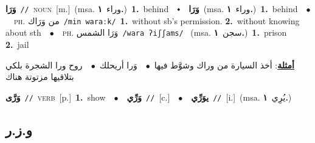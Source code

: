 \documentclass[10pt,a4paper,twoside]{article} %
\begin{document}
\begin{multicols}{2}
{\setlength\topsep{0pt}\textbf{\foreignlanguage{arabic}{وَرَا}}\ {\color{gray}\texttt{//}\color{black}}\ \textsc{noun}\ [m.]\ \color{gray}(msa. \foreignlanguage{arabic}{وراء}~\foreignlanguage{arabic}{\textbf{١.}})\color{black}\ \textbf{1.}~behind\ \ $\smblkdiamond$\ \ \setlength\topsep{0pt}\textbf{\foreignlanguage{arabic}{وَرَا}}\ \color{gray}(msa. \foreignlanguage{arabic}{وراء}~\foreignlanguage{arabic}{\textbf{١.}})\color{black}\ \textbf{1.}~behind\ \ $\bullet$\ \ \textsc{ph.} \color{gray} \foreignlanguage{arabic}{من وَرَاك}\color{black}\ {\color{gray}\texttt{/{\sffamily min waraːk}/}\color{black}}\ \textbf{1.}~without sb's permission.  \textbf{2.}~without knowing about sth\ \ $\bullet$\ \ \textsc{ph.} \color{gray} \foreignlanguage{arabic}{وَرَا الشمس}\color{black}\ {\color{gray}\texttt{/{\sffamily wara ʔiʃʃams}/}\color{black}}\ \color{gray} (msa. \foreignlanguage{arabic}{سجن}~\foreignlanguage{arabic}{\textbf{١.}})\color{black}\ \textbf{1.}~prison  \textbf{2.}~jail\  \begin{flushright}\color{gray}\foreignlanguage{arabic}{\textbf{\underline{\foreignlanguage{arabic}{أمثلة}}}: أخذ السيارة من وراك وشوَّط فيها\ $\bullet$\ \  وَرا أريحلك\ $\bullet$\ \  روح ورا الشجرة بلكي بتلاقيها مزتوتة هناك}\end{flushright}\color{black}} \vspace{2mm}

{\setlength\topsep{0pt}\textbf{\foreignlanguage{arabic}{وَرَّى}}\ {\color{gray}\texttt{//}\color{black}}\ \textsc{verb}\ [p.]\ \textbf{1.}~show\ \ $\bullet$\ \ \setlength\topsep{0pt}\textbf{\foreignlanguage{arabic}{وَرِّي}}\ {\color{gray}\texttt{//}\color{black}}\ [c.]\ \ $\bullet$\ \ \setlength\topsep{0pt}\textbf{\foreignlanguage{arabic}{يوَرِّي}}\ {\color{gray}\texttt{//}\color{black}}\ [i.]\ \color{gray}(msa. \foreignlanguage{arabic}{يُرِي}~\foreignlanguage{arabic}{\textbf{١.}})\color{black}\ } \vspace{2mm}

\vspace{-3mm}
\subsection*{\color{blue}\foreignlanguage{arabic}{و.ز.ر}\color{blue}{}} 


\end{multicols}
\end{document}
